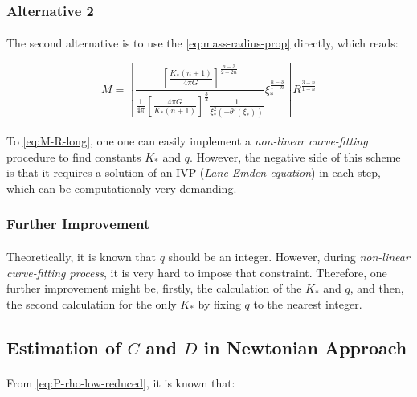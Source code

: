 \documentclass[letterpaper,12pt]{article}
\begin{document}
\subsubsection{Alternative 2}
\label{sec:Kq_fit_a2}

\paragraph{} The second alternative is to use the \eqref{eq:mass-radius-prop} directly, which reads:

\begin{equation}
    \label{eq:M-R-long}
    M = \left[\frac{ \left[\frac{K_* \left(n+1\right)}{4 \pi G}\right]^{\frac{n-3}{2 - 2n}} }{\frac{1}{4 \pi} \left[\frac{4 \pi G}{K_* \left(n+1\right)}\right]^{\frac{3}{2}}  \frac{1}{\xi_*^2\left(-\theta'(\xi_*)\right)}} \xi_*^{\frac{n-3}{1-n}} \right] R^{\frac{3-n}{1-n}}
\end{equation}

\paragraph{} To \eqref{eq:M-R-long}, one one can easily implement a \textit{non-linear curve-fitting} procedure to find constants $K_*$ and $q$. However, the negative side of this scheme is that it requires a solution of an IVP (\textit{Lane Emden equation}) in each step, which can be computationaly very demanding.

\subsubsection{Further Improvement}
\label{sec:Kq_fit_f}

\paragraph{} Theoretically, it is known that $q$ should be an integer. However, during \textit{non-linear curve-fitting process}, it is very hard to impose that constraint. Therefore, one further improvement might be, firstly, the calculation of the $K_*$ and $q$, and then, the second calculation for the only $K_*$ by fixing $q$ to the nearest integer.  


\subsection{Estimation of $C$ and $D$ in Newtonian Approach}
\label{sec:D_fit}
\paragraph{} From \eqref{eq:P-rho-low-reduced}, it is known that:
\end{document}
